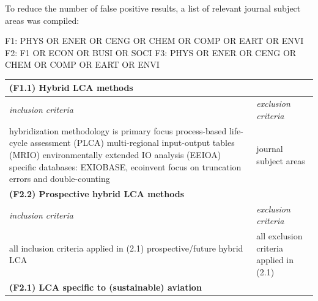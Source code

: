 \documentclass{article}
\begin{document}
            To reduce the number of false positive results, a list of relevant journal subject areas was compiled:
            
\begin{code_search}
F1: PHYS OR ENER OR CENG OR CHEM OR COMP OR EART OR ENVI
F2: F1 OR ECON OR BUSI OR SOCI
F3: PHYS OR ENER OR CENG OR CHEM OR COMP OR EART OR ENVI
\end{code_search}

        
            \begin{table}[H]
                \centering
                \begin{tabularx}{\textwidth}{| X | X |}
                    \hline
                \multicolumn{2}{|l|}{\textbf{(F1.1) Hybrid LCA methods}}  \\
                    \hline
                    \textit{inclusion criteria} & \textit{exclusion criteria} \\
                    \hline
                        hybridization methodology is primary focus \newline
                        process-based life-cycle assessment (PLCA) \newline
                        multi-regional input-output tables (MRIO) \newline
                        environmentally extended IO analysis (EEIOA) \newline
                        specific databases: EXIOBASE, ecoinvent \newline
                        focus on truncation errors and double-counting
                    &
                        journal subject areas
                    \\
                    \hline
                \multicolumn{2}{|l|}{\textbf{(F2.2) Prospective hybrid LCA methods}}  \\
                    \hline
                    \textit{inclusion criteria} & \textit{exclusion criteria} \\
                    \hline
                        all inclusion criteria applied in (2.1) \newline
                        prospective/future hybrid LCA
                    &
                        all exclusion criteria applied in (2.1)
                    \\
                    \hline
                \multicolumn{2}{|l|}{\textbf{(F2.1) LCA specific to (sustainable) aviation}}  \\
                    \hline

\end{tabularx}
\end{table}
\end{document}
